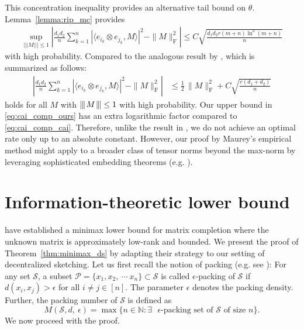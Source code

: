 \documentclass[11pt]{article}
\newcommand{\xspace}{\hbox{\kern-2.5pt}}
\newcommand\tnorm[1]{\left\vert\xspace\left\vert\xspace\left\vert\mskip2mu
#1\mskip2mu \right\vert\xspace\right\vert\xspace\right\vert}
\begin{document}
This concentration inequality provides an alternative tail bound on $\theta$. Lemma~\ref{lemma:rip_mc} provides 
\begin{align}
\sup_{\vert\vert\vert M \vert\vert\vert \leq 1} \left| \frac{d_1 d_2}{n} \sum_{k=1}^n |\langle e_{i_k} \otimes e_{j_k}, M \rangle|^2 - \|M\|_\mathrm{F}^2 \right| 
\leq
C \sqrt{\frac{d_1 d_2 r(m+n)\ln^3(m+n)}{n}}
\label{eq:cai_comp_ours} 
\end{align}
with high probability. 
Compared to the analogous result by \citet{cai2016matrix}, which is summarized as follows: 
\begin{align}
\left| \frac{d_1 d_2}{n} \sum_{k=1}^n |\langle e_{i_k} \otimes e_{j_k}, M \rangle|^2 - \|M\|_\mathrm{F}^2 \right| 
& \leq \frac{1}{2} \, \|M\|_{\mathrm{F}}^2+
C \sqrt{\frac{r (d_1+d_2)}{n}} \label{eq:cai_comp_cai}
\end{align} 
holds for all $M$ with $\tnorm{M} \leq 1$ with high probability. 
Our upper bound in \eqref{eq:cai_comp_ours} has an extra logarithmic factor compared to \eqref{eq:cai_comp_cai}.
Therefore, unlike the result in \citep{cai2016matrix}, we do not achieve an optimal rate only up to an absolute constant. 
However, our proof by Maurey's empirical method \citep{carl1985inequalities} might apply to a broader class of tensor norms beyond the max-norm by leveraging sophisticated embedding theorems (e.g. \citep{kashin1977diameters,figiel1977dimension,szarek1978kashins,szarek1980nearly,johnson1982embeddingl,pisier1983dimension,talagrand1998selecting,litvak2005euclidean,guedon2007subspaces,friedland2011random}). 

\section{Information-theoretic lower bound}
\label{sec:minimax}

\citet{cai2016matrix} have established a minimax lower bound for matrix completion where the unknown matrix is approximately low-rank and bounded.  
We present the proof of Theorem~\ref{thm:minimax_ds} by adapting their strategy to our setting of decentralized sketching. 
Let us first recall the notion of packing (e.g. see \citep[Definition~4.2.4]{vershynin2018high}): For any set $\mathcal{S}$, a subset $\mathcal{P} = \{ x_1, x_2, \ \cdots \ x_n \} \subset \mathcal{S}$ is called $\epsilon$-packing of $\mathcal{S}$ if $d(x_i, x_j) > \epsilon$ for all $i \neq j \in [n]$. 
The parameter $\epsilon$ denotes the packing density. 
Further, the packing number of $\mathcal{S}$ is defined as 
\begin{equation}
    \label{eq:def_packing_num}
    M(\mathcal{S},d,\ \epsilon) = \max\{n \in \mathbb{N} : \text{$\exists$ $\epsilon$-packing set of $\mathcal{S}$ of size $n$} \}.
\end{equation} We now proceed with the proof.
\end{document}
